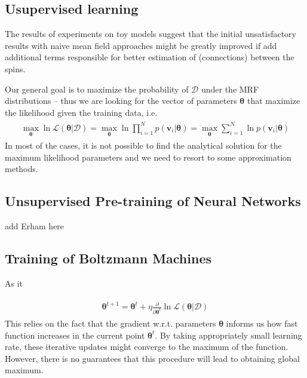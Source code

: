 \documentclass[../report/report.tex]{subfiles}
\begin{document}
\subsection{Usupervised learning}
The results of experiments on toy models suggest that the initial unsatisfactory results with naive mean field approaches \cite{tieleman2008training} might be greatly improved if add additional terms responsible for better estimation of (connections) between the spins.

\cite{dayan1999unsupervised}

Our general goal is to maximize the probability of $\mathcal{D}$ under the MRF distributions -- thus we are looking for the vector of parameters $\mathbf{\theta}$ that maximize the likelihood given the training data, i.e.
\begin{align}
\begin{split}
\max_{\mathbf{\theta}} \ln \mathcal{L}(\mathbf{\theta}| \mathcal{D}) = \max_{\mathbf{\theta}}  \ln \prod_{i=1}^N p(\mathbf{v}_i |\mathbf{\theta}) = \max_{\mathbf{\theta}} \sum_{i=1}^N \ln p(\mathbf{v}_i |\mathbf{\theta} )
\end{split}
\end{align}
In most of the cases, it is not possible to find the analytical solution for the maximum likelihood parameters and we need to resort to some approximation methods.



\subsection{Unsupervised Pre-training of Neural Networks}
add Erham here
\subsection{Training of Boltzmann Machines}
As it 

\begin{align}
\begin{split}
\mathbf{\theta}^{t+1} = \mathbf{\theta}^{t} + \eta  \frac{\partial}{\partial \mathbf{\theta}^t}  \ln \mathcal{L}(\mathbf{\theta}| \mathcal{D}) 
\end{split}
\end{align}
This relies on the fact that the gradient w.r.t. parameters $\mathbf{\theta}$ informs us how fast function increases in the current point $\mathbf{\theta}^{t}$. By taking appropriately small learning rate, these iterative updates might converge to the maximum of the function. However, there is no guarantees that this procedure will lead to obtaining global maximum.
\end{document}
